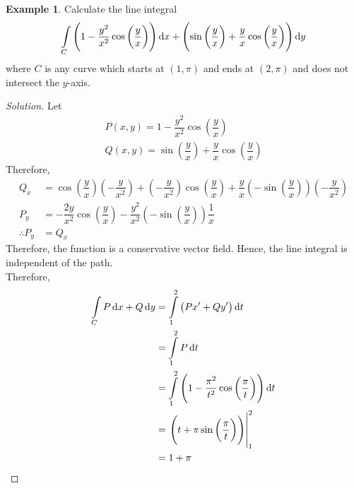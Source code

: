 \documentclass[fleqn, a4paper, 12pt]{article}
\theoremstyle{definition}
\newtheorem{example}{Example}
\theoremstyle{theorem}
\theoremstyle{remark}
\newenvironment{solution}
{\begin{proof}[Solution]\let\qed\relax}
	{\end{proof}}
\begin{document}
\begin{example}
	Calculate the line integral \[ \int\limits_{C} \left( 1 - \dfrac{y^2}{x^2} \cos \left( \dfrac{y}{x} \right) \right) \dif x + \left( \sin \left( \dfrac{y}{x} \right) + \dfrac{y}{x} \cos \left( \dfrac{y}{x} \right) \right) \dif y \] where $C$ is any curve which starts at $(1, \pi)$ and ends at $(2,\pi)$ and does not intersect the $y$-axis.
\end{example}

\begin{solution}
	Let
	\begin{align*}
		P(x,y) = 1 - \dfrac{y^2}{x^2} \cos \left( \dfrac{y}{x} \right)\\
		Q(x,y) = \sin \left( \dfrac{y}{x} \right) + \dfrac{y}{x} \cos \left( \dfrac{y}{x} \right)
	\end{align*}
	Therefore,
	\begin{align*}
		Q_x &= \cos \left( \dfrac{y}{x} \right) \left( -\dfrac{y}{x^2} \right) + \left( - \dfrac{y}{x^2} \right) \cos \left( \dfrac{y}{x} \right) + \dfrac{y}{x} \left( -\sin \left( \dfrac{y}{x} \right) \right) \left( -\dfrac{y}{x^2} \right)\\
		P_y &= -\dfrac{2y}{x^2} \cos \left( \dfrac{y}{x} \right) - \dfrac{y^2}{x^2} \left( -\sin \left( \dfrac{y}{x} \right) \right) \dfrac{1}{x}\\
		\therefore P_y &= Q_x
	\end{align*}
	Therefore, the function is a conservative vector field. Hence, the line integral is independent of the path.\\
	Therefore,
	\begin{align*}
		\int\limits_{C} P \dif x + Q \dif y &= \int\limits_{1}^{2} \left( P x' + Q y' \right) \dif t\\
		&= \int\limits_{1}^{2} P \dif t\\
		&= \int\limits_{1}^{2} \left( 1 - \dfrac{\pi^2}{t^2} \cos \left( \dfrac{\pi}{t} \right) \right) \dif t\\
		&= \left. \left( t + \pi \sin \left( \dfrac{\pi}{t} \right) \right) \right|_{1}^{2}\\
		&= 1 + \pi
	\end{align*}
\end{solution}
\end{document}
